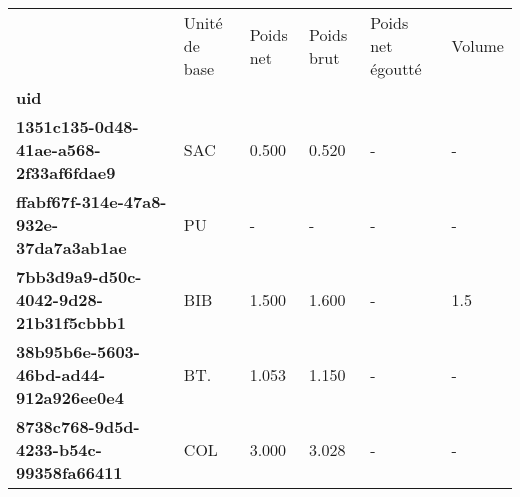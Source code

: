 \begin{tabularx}{\linewidth}{lXXXXX}
\toprule
{} & Unité de base &  Poids net &  Poids brut &  Poids net égoutté &  Volume \\
\textbf{uid                                 } &               &            &             &                    &         \\
\midrule
\textbf{1351c135-0d48-41ae-a568-2f33af6fdae9} &           SAC &      0.500 &       0.520 &                  - &       - \\
\textbf{ffabf67f-314e-47a8-932e-37da7a3ab1ae} &            PU &          - &           - &                  - &       - \\
\textbf{7bb3d9a9-d50c-4042-9d28-21b31f5cbbb1} &           BIB &      1.500 &       1.600 &                  - &     1.5 \\
\textbf{38b95b6e-5603-46bd-ad44-912a926ee0e4} &           BT. &      1.053 &       1.150 &                  - &       - \\
\textbf{8738c768-9d5d-4233-b54c-99358fa66411} &           COL &      3.000 &       3.028 &                  - &       - \\
\bottomrule
\end{tabularx}
